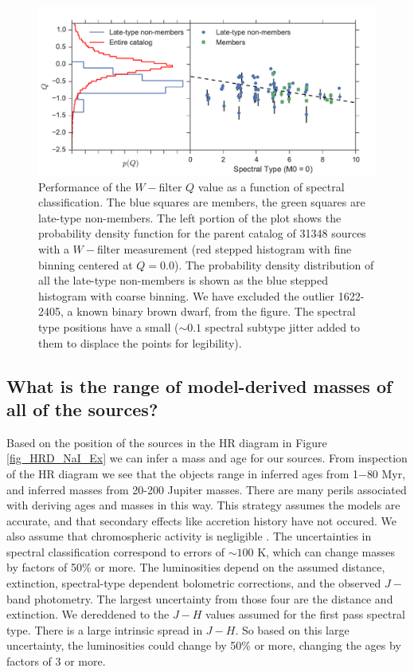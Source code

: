 \begin{figure}[ht!]
  \caption[Performance of the $W-$filter $Q$ value as a function of spectral type]{Performance of the $W-$filter $Q$ value as a function of spectral classification.  The blue squares are members, the green squares are late-type non-members.  The left portion of the plot shows the probability density function for the parent catalog of 31348 sources with a $W-$filter measurement (red stepped histogram with fine binning centered at $Q=0.0$).  The probability density distribution of all the late-type non-members is shown as the blue stepped histogram with coarse binning. We have excluded the outlier 1622-2405, a known binary brown dwarf, from the figure.  The spectral type positions have a small ($\sim0.1$ spectral subtype jitter added to them to displace the points for legibility).\label{fig_W_results} }
\centering
\includegraphics[scale=0.6]{chIMACS/figures/W_filter_results}
\end{figure}


\subsection{What is the range of model-derived masses of all of the sources?}
Based on the position of the sources in the HR diagram in Figure \ref{fig_HRD_NaI_Ex} we can infer a mass and age for our sources.  From inspection of the HR diagram we see that the objects range in inferred ages from 1$-$80 Myr, and inferred masses from 20-200 Jupiter masses.  There are many perils associated with deriving ages and masses in this way.  This strategy assumes the models are accurate, and that secondary effects like accretion history have not occured.  We also assume that chromospheric activity is negligible \citep{2014ApJ...796..119S}.  The uncertainties in spectral classification correspond to errors of $\sim100$ K, which can change masses by factors of 50\% or more.  The luminosities depend on the assumed distance, extinction, spectral-type dependent bolometric corrections, and the observed $J-$ band photometry.  The largest uncertainty from those four are the distance and extinction.  We dereddened to the $J-H$ values assumed for the first pass spectral type.  There is a large intrinsic spread in $J-H$.  So based on this large uncertainty, the luminosities could change by 50\% or more, changing the ages by factors of 3 or more.  


